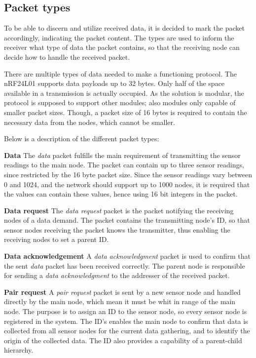 \subsection{Packet types}
To be able to discern and utilize received data, it is decided to mark the packet accordingly, indicating the packet content.
The types are used to inform the receiver what type of data the packet contains, so that the receiving node can decide how to handle the received packet. 

There are multiple types of data needed to make a functioning protocol. The nRF24L01 supports data payloads up to 32 bytes. Only half of the space available in a transmission is actually occupied. As the solution is modular, the protocol is supposed to support other modules; also modules only capable of smaller packet sizes. Though, a packet size of 16 bytes is required to contain the necessary data from the nodes, which cannot be smaller.

Below is a description of the different packet types:

\textbf{Data}\newline
The \textit{data} packet fulfills the main requirement of transmitting the sensor readings to the main node. The packet can contain up to three sensor readings, since restricted by the 16 byte packet size. Since the sensor readings vary between 0 and 1024, and the network should support up to 1000 nodes, it is required that the values can contain these values, hence using 16 bit integers in the packet.

\textbf{Data request}\newline 
The \textit{data request} packet is the packet notifying the receiving nodes of a data demand. 
The packet contains the transmitting node's ID, so that sensor nodes receiving the packet knows the transmitter, thus enabling the receiving nodes to set a parent ID.

\textbf{Data acknowledgement}\newline
A \textit{data acknowledgment} packet is used to confirm that the sent \textit{data} packet has been received correctly. The parent node is responsible for sending a \textit{data acknowledgment} to the addresser of the received packet. 

\textbf{Pair request}\newline
A \textit{pair request} packet is sent by a new sensor node and handled directly by the main node, which mean it must be whit in range of the main node. The purpose is to assign an ID to the sensor node, so every sensor node is registered in the system. The ID's enables the main node to confirm that data is collected from all sensor nodes for the current data gathering, and to identify the origin of the collected data. The ID also provides a capability of a parent-child hierarchy.

